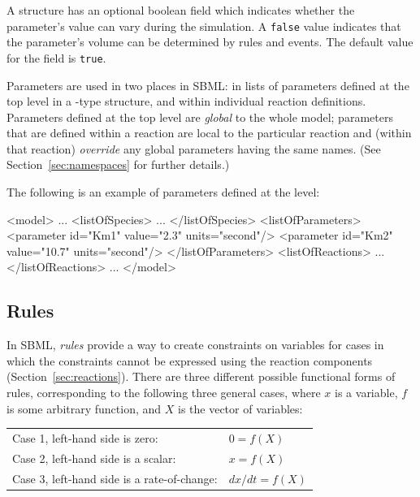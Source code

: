 \documentclass[10pt]{cekarticle}
\begin{document}
A  structure has an optional 
boolean field which indicates whether the parameter's value can
vary during the simulation.  A \texttt{false} value indicates that
the parameter's volume can be determined by rules and events.  The
default value for the  field is \texttt{true}.

Parameters are used in two places in SBML: in lists of parameters defined
at the top level in a -type structure, and within individual
reaction definitions.  Parameters defined at the top level are
\emph{global} to the whole model; parameters that are defined within
a reaction are local to the particular reaction and (within that reaction)
\emph{override} any global parameters having the same names.  (See
Section~\ref{sec:namespaces} for further details.)

The following is an example of parameters defined at the  level:

\begin{example}
<model>
    ...
    <listOfSpecies>
        ...
    </listOfSpecies>
    <listOfParameters>
        <parameter id="Km1" value="2.3" units="second"/>
        <parameter id="Km2" value="10.7" units="second"/>
    </listOfParameters>
    <listOfReactions>
        ...
    </listOfReactions>
    ...
</model>
\end{example}

\subsection{Rules}
\label{sec:rules}

In SBML, \emph{rules} provide a way to create constraints on
variables for cases in which the constraints cannot be expressed
using the reaction components (Section~\ref{sec:reactions}). There
are three different possible functional forms of rules,
corresponding to the following three general cases, where $x$ is a
variable, $f$ is some arbitrary function, and $X$ is the vector of
variables:

\begin{center}
\begin{tabular}{ll}
  Case 1, left-hand side is zero:             & $0 = f(X)$\\
  Case 2, left-hand side is a scalar:         & $x = f(X)$\\
  Case 3, left-hand side is a rate-of-change: & $dx/dt = f(X)$
\end{tabular}
\end{center}
\end{document}

